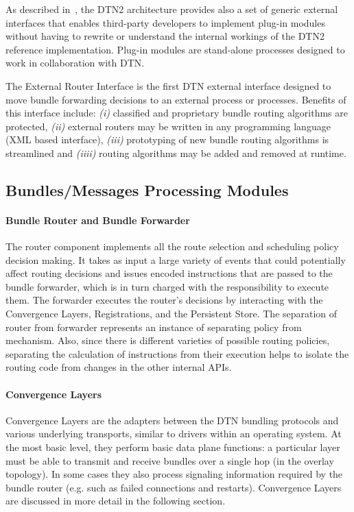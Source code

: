 As described in~\cite{Demmer03implementingdelay, DTN2Manual}, the DTN2 architecture provides also a set of generic external interfaces that enables third-party developers to implement plug-in modules without having to rewrite or understand the internal workings of the DTN2 reference implementation. Plug-in modules are stand-alone processes designed to work in collaboration with DTN.

The External Router Interface is the first DTN external interface designed to move bundle forwarding decisions to an external process or processes. Benefits of this interface include: \emph{(i)} classified and proprietary bundle routing algorithms are protected, \emph{(ii)} external routers may be written in any programming language (XML based interface), \emph{(iii)} prototyping of new bundle routing algorithms is streamlined and \emph{(iiii)} routing algorithms may be added and removed at runtime.

\subsection{Bundles/Messages Processing Modules}

\paragraph{Bundle Router and Bundle Forwarder}
 
The router component implements all the route selection and scheduling policy decision making. It takes as input a large variety of events that could potentially affect routing decisions and issues encoded instructions that are passed to the bundle forwarder, which is in turn charged with the responsibility to execute them. The forwarder executes the router's decisions by interacting with the Convergence Layers, Registrations, and the Persistent Store. The separation of router from forwarder represents an instance of separating policy from mechanism. Also, since there is different varieties of possible routing policies, separating the calculation of instructions from their execution helps to isolate the routing code from changes in the other internal APIs.

\paragraph{Convergence Layers}
Convergence Layers are the adapters between the DTN bundling protocols and various underlying transports,
similar to drivers within an operating system. At the most basic level, they perform basic data plane functions: a
particular layer must be able to transmit and receive bundles over a single hop (in the overlay topology). In some
cases they also process signaling information required by the bundle router (e.g. such as failed connections and
restarts). Convergence Layers are discussed in more detail in the following section.

